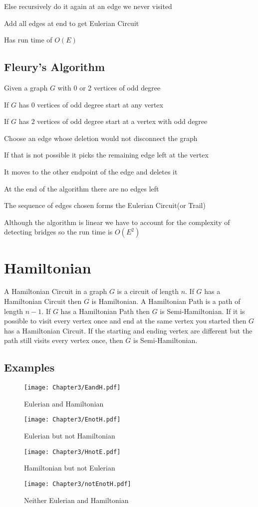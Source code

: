   Else recursively do it again at an edge we never visited

  Add all edges at end to get Eulerian Circuit

  Has run time of $O(E)$\cite{EulerianAlgos}
  \subsection{Fleury's Algorithm}
  Given a graph $G$ with 0 or  2 vertices of odd degree

  If $G$ has 0 vertices of odd degree start at any vertex

  If $G$ has 2 vertices of odd degree start at a vertex with odd degree

  Choose an edge whose deletion would not disconnect the graph

  If that is not possible it picks the remaining edge left at the vertex

  It moves to the other endpoint of the edge and deletes it

  At the end of the algorithm there are no edges left

  The sequence of edges chosen forms the Eulerian Circuit(or Trail)

  Although the algorithm is linear we have to account for the complexity of detecting bridges so the run time is $O(E^2)$\cite{EulerianAlgos}
 

  
  \section{Hamiltonian}
  A Hamiltonian Circuit in a graph $G$ is a circuit of length $n$. If $G$ has a Hamiltonian Circuit then $G$ is Hamiltonian. A Hamiltonian Path is a path of length $n-1$. If $G$ has a Hamiltonian Path then $G$ is Semi-Hamiltonian. If it is possible to visit every vertex once and end at the same vertex you started then $G$ has a Hamiltonian Circuit. If the starting and ending vertex are different but the path still visits every vertex once, then $G$ is Semi-Hamiltonian.

  \subsection{Examples}
  \begin{figure}
  	\centering
  	\texttt{[image: Chapter3/EandH.pdf]}
	\caption{Eulerian and Hamiltonian}
  \end{figure}
  \begin{figure}
  	\centering
  	\texttt{[image: Chapter3/EnotH.pdf]}
	\caption{Eulerian but not Hamiltonian}
  \end{figure}
  \begin{figure}
  	\centering
  	\texttt{[image: Chapter3/HnotE.pdf]}
	\caption{Hamiltonian but not Eulerian}
  \end{figure}
  \begin{figure}
  	\centering
  	\texttt{[image: Chapter3/notEnotH.pdf]}
	\caption{Neither Eulerian and Hamiltonian}
  \end{figure}

